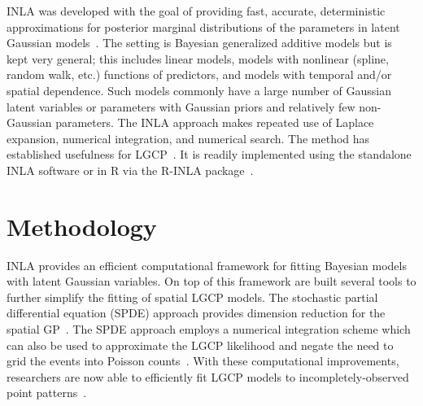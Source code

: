 \documentclass[]{interact}
\begin{document}
INLA was developed with the goal of providing fast, accurate, deterministic
approximations for posterior marginal distributions of the parameters in
latent Gaussian models~\cite{rueetal}. The setting is Bayesian generalized
additive models but is kept very general; this includes linear models, models
with nonlinear (spline, random walk, etc.) functions of predictors, and models
with temporal and/or spatial dependence. Such models commonly have a large
number of Gaussian latent variables or parameters with Gaussian priors and
relatively few non-Gaussian parameters. The INLA approach makes repeated use
of Laplace expansion, numerical integration, and numerical search. The method
has established usefulness for LGCP~\cite{illianetal}. It is readily
implemented using the standalone INLA software or in R via the
R-INLA package~\cite{inlar}.











\section{Methodology}

INLA provides an efficient computational framework for fitting Bayesian models
with latent Gaussian variables. On top of this framework are built several
tools to further simplify the fitting of spatial LGCP models. The stochastic
partial differential equation (SPDE) approach provides dimension reduction for
the spatial GP~\cite{lindgrenetal}. The SPDE approach employs a numerical
integration scheme which can also be used to approximate the LGCP likelihood
and negate the need to grid the events into Poisson counts~\cite{simpsonetal}.
With these computational improvements, researchers are now able to efficiently
fit LGCP models to incompletely-observed point patterns~\cite{yuanetal}.  
\end{document}
